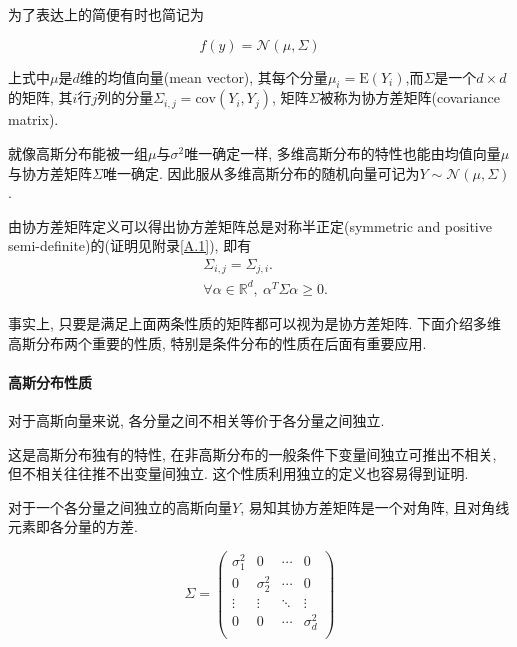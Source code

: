                 为了表达上的简便有时也简记为

                \begin{equation}
                    f(y)=\mathcal{N}(\mu, \Sigma)
                \end{equation}

                上式中$\mu$是$d$维的均值向量(mean vector), 其每个分量$\mu_{i}=\mathrm{E}(Y_{i})$,而$\Sigma$是一个$d\times d$的矩阵, 其$i$行$j$列的分量$\Sigma_{i,j}=\mathrm{cov}(Y_{i},Y_{j})$, 矩阵$\Sigma$被称为协方差矩阵(covariance matrix).

                就像高斯分布能被一组$\mu$与$\sigma^{2}$唯一确定一样, 多维高斯分布的特性也能由均值向量$\mu$与协方差矩阵$\Sigma$唯一确定. 因此服从多维高斯分布的随机向量可记为$Y\sim\mathcal{N}(\mu,\Sigma)$.

                由协方差矩阵定义可以得出协方差矩阵总是对称半正定(symmetric and positive semi-definite)的(证明见附录\ref{A.1}), 即有
                \begin{align}
                    &\Sigma_{i,j}=\Sigma_{j,i}. \\
                    &\forall\alpha\in\mathds{R}^{d},\ \alpha^{T}\Sigma\alpha\geqslant 0.
                \end{align}

                事实上, 只要是满足上面两条性质的矩阵都可以视为是协方差矩阵. 下面介绍多维高斯分布两个重要的性质, 特别是条件分布的性质在后面有重要应用.

            \paragraph{高斯分布性质}
                \begin{property}
                    对于高斯向量来说, 各分量之间不相关等价于各分量之间独立.
                \end{property}

                这是高斯分布独有的特性, 在非高斯分布的一般条件下变量间独立可推出不相关, 但不相关往往推不出变量间独立. 这个性质利用独立的定义也容易得到证明.

                对于一个各分量之间独立的高斯向量$Y$, 易知其协方差矩阵是一个对角阵, 且对角线元素即各分量的方差.

                \begin{equation}
                    \Sigma= \begin{pmatrix}
                                \sigma^{2}_{1} & 0 & \cdots & 0 \\
                                0 & \sigma^{2}_{2} & \cdots & 0 \\ 
                                \vdots & \vdots & \ddots & \vdots \\
                                0 & 0 & \cdots & \sigma^{2}_{d} \\
                            \end{pmatrix}
                \end{equation}
                
